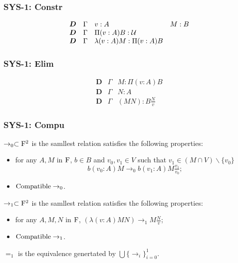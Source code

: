 \subsubsection*{SYS-1: Constr}
\[
  \begin{array}{llll}
    \boldsymbol{D} & \Gamma & v : A  & M : B
    \\ 
    \boldsymbol{D} & \Gamma & \Pi(v: A)B : \mathcal{U}   &
    \\
    \boldsymbol{D} & \Gamma & \lambda(v:A)M : \Pi(v:A)B  &
  \end{array}
\]



\subsubsection*{SYS-1: Elim}
\[
  \begin{array}{lll}
    \bm D & \Gamma & M : \Pi (v : A) B
    \\ 
    \bm D & \Gamma & N : A
    \\
    \bm D & \Gamma & (MN) : B\frac{N}{v}
  \end{array}
\]




\subsubsection*{SYS-1: Compu}

\begin{definition}
  $\rightarrow_{0} \subset \mathrm{F}^2$ is the samllest relation satisfies the following properties:
  \begin{itemize}
    \item for any $A, M$ in $\mathrm{F}$, $b \in B$ and $v_0, v_1 \in V$ such that $v_1 \in (M \cap V) \smallsetminus \{ v_0 \} $ 
      \[
        b(v_0 : A)M \rightarrow_0 b (v_1 : A) M \tfrac{v_1}{v_0};
      \]
    \item $\mathrm{Compatible}\rightarrow_0$.
  \end{itemize}
\end{definition}

\begin{definition}
  $\rightarrow_{1} \subset \mathrm{F}^2$ is the samllest relation satisfies the following properties:
  \begin{itemize}
    \item for any $A, M, N$ in $\mathrm{F}$, $(\lambda (v : A) M N) \rightarrow_1 M \frac{N}{v}$;
    \item $\mathrm{Compatible}\rightarrow_1$.
  \end{itemize}
  $=_1$ is the equivalence genertated by $\bigcup \{ \rightarrow_i \}_{i=0}^1$.
\end{definition}


